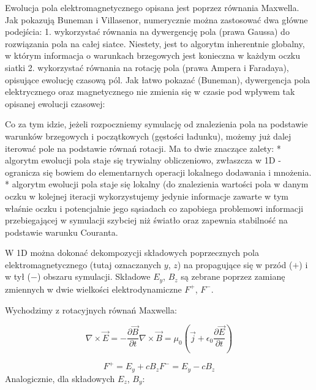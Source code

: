     Ewolucja pola elektromagnetycznego opisana jest poprzez równania Maxwella. Jak pokazują Buneman i Villasenor,
    numerycznie można zastosować dwa główne podejścia: 
    1. wykorzystać równania na dywergencję pola (prawa Gaussa) do rozwiązania pola na całej siatce. Niestety, jest to
    algorytm inherentnie globalny, w którym informacja o warunkach brzegowych jest konieczna w każdym oczku siatki
    2. wykorzystać równania na rotację pola (prawa Ampera i Faradaya), opisujące ewolucję czasową pól. Jak łatwo pokazać (Buneman),
    dywergencja pola elektrycznego oraz magnetycznego nie zmienia się w czasie pod wpływem tak opisanej ewolucji czasowej:

    Co za tym idzie, jeżeli rozpoczniemy symulację od znalezienia pola na podstawie warunków brzegowych i początkowych (gęstości
    ładunku), możemy już dalej iterować pole na podstawie równań rotacji. Ma to dwie znaczące zalety:
    * algorytm ewolucji pola staje się trywialny obliczeniowo, zwłaszcza w 1D -
        ogranicza się bowiem do elementarnych operacji lokalnego dodawania i mnożenia.
    * algorytm ewolucji pola staje się lokalny (do znalezienia wartości pola w danym oczku w kolejnej iteracji wykorzystujemy
    jedynie informacje zawarte w tym właśnie oczku i potencjalnie jego sąsiadach 
    co zapobiega problemowi informacji przebiegającej w symulacji szybciej niż światło oraz zapewnia stabilność na podstawie
    warunku Couranta.

    W 1D można dokonać dekompozycji składowych poprzecznych pola elektromagnetycznego (tutaj oznaczanych $y$, $z$) na
    propagujące się w przód ($+$) i w tył ($-$) obszaru symulacji. Składowe $E_y$, $B_z$ są zebrane poprzez zamianę zmiennych
    w dwie wielkości elektrodynamiczne $F^+$, $F^-$.

    Wychodzimy z rotacyjnych równań Maxwella:

    \begin{equation}
        \nabla \times \vec{E} = -\frac{\partial \vec{B}}{\partial t}
        \nabla \times \vec{B} = \mu_0 (\vec{j} + \epsilon_0 \frac{\partial \vec{E}}{\partial t})
        \label{eqn:Maxwell-rotation-derivation}
    \end{equation}


    \begin{equation}
        F^{+} = E_y + c B_z
        F^{-} = E_y - c B_z
        \label{eqn:Birdsall-electromagnetic-quantities}
    \end{equation}
    Analogicznie, dla składowych $E_z$, $B_y$:

